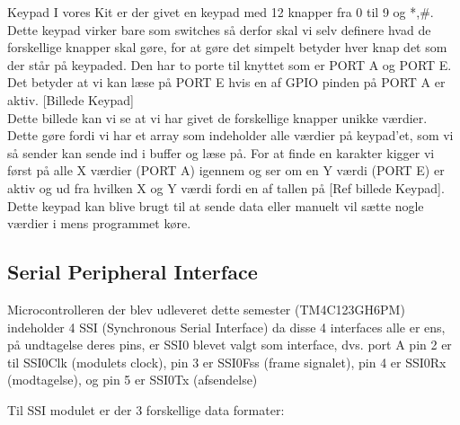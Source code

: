 Keypad
I vores Kit er der givet en keypad med 12 knapper fra 0 til 9 og *,\#. Dette keypad virker bare som switches så derfor skal vi selv definere hvad de forskellige knapper skal gøre, for at gøre det simpelt betyder hver knap det som der står på keypaded. Den har to porte til knyttet som er PORT A og PORT E. Det betyder at vi kan læse på PORT E hvis en af GPIO pinden på PORT A er aktiv. [Billede Keypad]
\\
Dette billede kan vi se at vi har givet de forskellige knapper unikke værdier. Dette gøre fordi vi har et array som indeholder alle værdier på keypad’et, som vi så sender kan sende ind i buffer og læse på. For at finde en karakter kigger vi først på alle X værdier (PORT A) igennem og ser om en Y værdi (PORT E) er aktiv og ud fra hvilken X og Y værdi fordi en af tallen på  [Ref billede Keypad].
\\
Dette keypad kan blive brugt til at sende data eller manuelt vil sætte nogle værdier i mens programmet køre.


\subsection{Serial Peripheral Interface}

Microcontrolleren der blev udleveret dette semester (TM4C123GH6PM) indeholder 4 SSI (Synchronous Serial Interface) da disse 4 interfaces alle er ens, på undtagelse deres pins, er SSI0 blevet valgt som interface, dvs. port A pin 2 er til SSI0Clk (modulets clock), pin 3 er SSI0Fss (frame signalet), pin 4 er SSI0Rx (modtagelse), og pin 5 er SSI0Tx (afsendelse)

Til SSI modulet er der 3 forskellige data formater:

